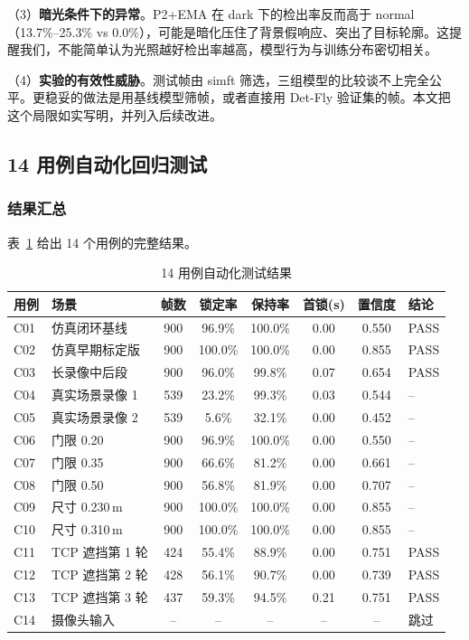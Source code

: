 （3）\textbf{暗光条件下的异常}。P2+EMA 在 dark 下的检出率反而高于 normal（13.7\%--25.3\% vs 0.0\%），可能是暗化压住了背景假响应、突出了目标轮廓。这提醒我们，不能简单认为光照越好检出率越高，模型行为与训练分布密切相关。

（4）\textbf{实验的有效性威胁}。测试帧由 simft 筛选，三组模型的比较谈不上完全公平。更稳妥的做法是用基线模型筛帧，或者直接用 Det-Fly 验证集的帧。本文把这个局限如实写明，并列入后续改进。

\subsection{14 用例自动化回归测试}

\subsubsection{结果汇总}

表~\ref{tab:test14} 给出 14 个用例的完整结果。

\begin{table}[htbp]
\centering
\caption{14 用例自动化测试结果}
\label{tab:test14}
\small
\begin{tabular}{llcccccl}
\toprule
\textbf{用例} & \textbf{场景} & \textbf{帧数} & \textbf{锁定率} & \textbf{保持率} & \textbf{首锁(s)} & \textbf{置信度} & \textbf{结论} \\
\midrule
C01 & 仿真闭环基线 & 900 & 96.9\% & 100.0\% & 0.00 & 0.550 & PASS \\
C02 & 仿真早期标定版 & 900 & 100.0\% & 100.0\% & 0.00 & 0.855 & PASS \\
C03 & 长录像中后段 & 900 & 96.0\% & 99.8\% & 0.07 & 0.654 & PASS \\
C04 & 真实场景录像 1 & 539 & 23.2\% & 99.3\% & 0.03 & 0.544 & -- \\
C05 & 真实场景录像 2 & 539 & 5.6\% & 32.1\% & 0.00 & 0.452 & -- \\
C06 & 门限 0.20 & 900 & 96.9\% & 100.0\% & 0.00 & 0.550 & -- \\
C07 & 门限 0.35 & 900 & 66.6\% & 81.2\% & 0.00 & 0.661 & -- \\
C08 & 门限 0.50 & 900 & 56.8\% & 81.9\% & 0.00 & 0.707 & -- \\
C09 & 尺寸 0.230\,m & 900 & 100.0\% & 100.0\% & 0.00 & 0.855 & -- \\
C10 & 尺寸 0.310\,m & 900 & 100.0\% & 100.0\% & 0.00 & 0.855 & -- \\
C11 & TCP 遮挡第 1 轮 & 424 & 55.4\% & 88.9\% & 0.00 & 0.751 & PASS \\
C12 & TCP 遮挡第 2 轮 & 428 & 56.1\% & 90.7\% & 0.00 & 0.739 & PASS \\
C13 & TCP 遮挡第 3 轮 & 437 & 59.3\% & 94.5\% & 0.21 & 0.751 & PASS \\
C14 & 摄像头输入 & -- & -- & -- & -- & -- & 跳过 \\
\bottomrule
\end{tabular}
\end{table}

